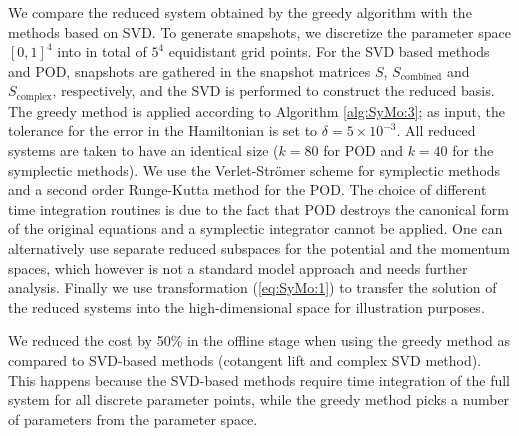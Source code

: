 We compare the reduced system obtained by the greedy algorithm with the methods based on SVD. To generate snapshots, we discretize the parameter space $[0,1]^4$ into in total of $5^4$ equidistant grid points. For the SVD based methods and POD, snapshots are gathered in the snapshot matrices $S$, $S_{\text{combined}}$ and $S_{\text{complex}}$, respectively, and the SVD is performed to construct the reduced basis. The greedy method is applied according to Algorithm \ref{alg:SyMo:3}; as input, the tolerance for the error in the Hamiltonian is set to $\delta = 5 \times 10^{-3}$. All reduced systems are taken to have an identical size ($k=80$ for POD and $k=40$ for the symplectic methods). We use the Verlet-Str\"omer scheme for symplectic methods and a second order Runge-Kutta method for the POD. {\edit The choice of different time integration routines is due to the fact that POD destroys the canonical form of the original equations and a symplectic integrator cannot be applied. One can alternatively use separate reduced subspaces for the potential and the momentum spaces, which however is not a standard model approach and needs further analysis.} Finally we use transformation (\ref{eq:SyMo:1}) to transfer the solution of the reduced systems into the high-dimensional space for illustration purposes.



We reduced the cost by 50\% in the offline stage when using the greedy method as compared to SVD-based methods (cotangent lift and complex SVD method). This happens because the SVD-based methods require time integration of the full system for all discrete parameter points, while the greedy method picks a number of parameters from the parameter space. 


%
%




